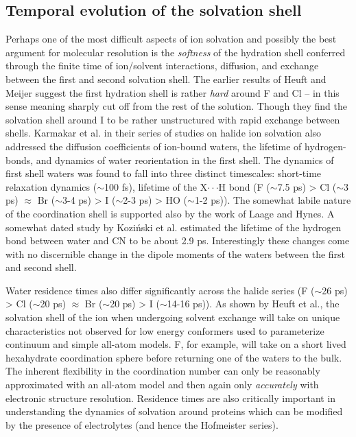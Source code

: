 \begin{intro}
  \subsection{\label{ch1:sec3:level3}Temporal evolution of the solvation shell}
   Perhaps one of the most difficult aspects of ion solvation and possibly the best argument for molecular resolution is the \emph{softness} of the hydration shell conferred through
   the finite time of ion/solvent interactions, diffusion, and exchange between the first and second solvation shell. The earlier results of Heuft and Meijer suggest the first hydration 
   shell is rather \emph{hard} around F\sur{-} and Cl\sur{-} -- in this sense meaning sharply cut off from the rest of the solution\cite{heuft2003cl,heuft2005f}. Though they find the
   solvation shell around I\sur{-} to be rather unstructured with rapid exchange between shells\cite{heuft2005i}. Karmakar et al. in their series of studies on halide ion solvation 
   also addressed the diffusion coefficients of ion-bound waters, the lifetime of hydrogen-bonds, and dynamics of water reorientation in the first 
   shell\cite{choudhuri2012first,karmakar2015water}. The dynamics of first shell waters was found to fall into three distinct timescales: short-time relaxation dynamics ($\sim$100 fs), 
   lifetime of the X\sur{\pm}$\cdot\cdot\cdot$H bond (F\sur{-} ($\sim$7.5 ps) > Cl\sur{-} ($\sim$3 ps) $\approx$ Br\sur{-} ($\sim$3-4 ps) > I\sur{-} ($\sim$2-3 ps) > HO 
   ($\sim$1-2 ps)\cite{bankura2014structure,ojha2015ultrafast}). The somewhat labile nature of the coordination shell is supported also by the work of Laage and 
   Hynes\cite{laage2007reorientional}. A somewhat dated study by Kozi{\'n}ski et al. estimated the lifetime of the hydrogen bond between water and CN\sur{-} to be about 2.9 
   ps\cite{kozinski2007vibrational}. Interestingly these changes come with no discernible change in the dipole moments of the waters between the first and second 
   shell\cite{heuft2003cl,heuft2005f,heuft2005i,krekeler2006density}.

   Water residence times also differ significantly across the halide series (F\sur{-} ($\sim$26 ps) > Cl\sur{-} ($\sim$20 ps) $\approx$ Br\sur{-} ($\sim$20 ps) > I\sur{-} ($\sim$14-16 ps)). 
   As shown by Heuft et al., the solvation shell of the ion when undergoing solvent exchange will take on unique characteristics not observed for low energy conformers used to parameterize 
   continuum and simple all-atom models\cite{heuft2003cl,heuft2005f,heuft2005i}. F\sur{-}, for example, will take on a short lived hexahydrate coordination sphere before returning one of
   the waters to the bulk\cite{heuft2005f}. The inherent flexibility in the coordination number can only be reasonably approximated with an all-atom model and then again only 
   \emph{accurately} with electronic structure resolution. Residence times are also critically important in understanding the dynamics of solvation around proteins\cite{pal2002biological}
   which can be modified by the presence of electrolytes (and hence the Hofmeister series).
   

\end{intro}
